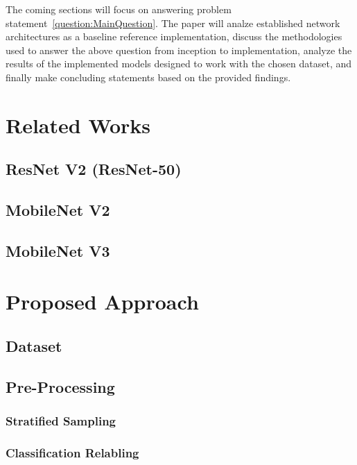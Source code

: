 \documentclass[conference]{IEEEtran}
\begin{document}
The coming sections will focus on answering problem
statement~\ref{question:MainQuestion}. The paper will analze established network
architectures as a baseline reference implementation, discuss the methodologies
used to answer the above question from inception to implementation, analyze the
results of the implemented models designed to work with the chosen dataset, and
finally make concluding statements based on the provided findings.




\section{Related Works} %


\subsection{ResNet V2 (ResNet-50)}


\subsection{MobileNet V2}


\subsection{MobileNet V3}





\section{Proposed Approach} %


\subsection{Dataset}\label{ProposedApproach-Dataset}


\subsection{Pre-Processing}

\subsubsection{Stratified Sampling}


\subsubsection{Classification Relabling}
\end{document}
